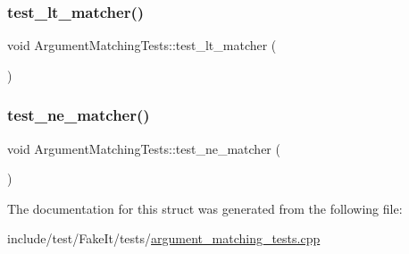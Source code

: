 \subsubsection{\texorpdfstring{test\_lt\_matcher()}{test\_lt\_matcher()}}
{\footnotesize\ttfamily void Argument\+Matching\+Tests\+::test\+\_\+lt\+\_\+matcher (\begin{DoxyParamCaption}{ }\end{DoxyParamCaption})\hspace{0.3cm}{\ttfamily [inline]}}

\mbox{\label{structArgumentMatchingTests_ac232cb4a48de7277eb8005c070ea4da1}} 
\subsubsection{\texorpdfstring{test\_ne\_matcher()}{test\_ne\_matcher()}}
{\footnotesize\ttfamily void Argument\+Matching\+Tests\+::test\+\_\+ne\+\_\+matcher (\begin{DoxyParamCaption}{ }\end{DoxyParamCaption})\hspace{0.3cm}{\ttfamily [inline]}}



The documentation for this struct was generated from the following file\+:\begin{DoxyCompactItemize}
\item 
include/test/\+Fake\+It/tests/\mbox{\hyperlink{argument__matching__tests_8cpp}{argument\+\_\+matching\+\_\+tests.\+cpp}}\end{DoxyCompactItemize}
